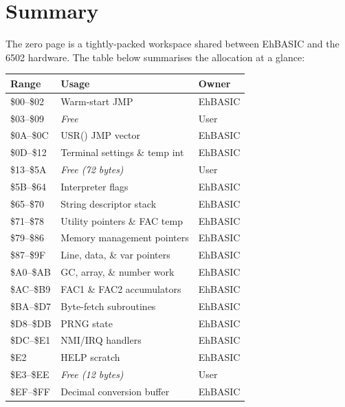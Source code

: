 \section*{Summary}

The zero page is a tightly-packed workspace shared between EhBASIC and the
6502 hardware.  The table below summarises the allocation at a glance:

\begin{center}
\small
\begin{tabular}{@{}lll@{}}
\toprule
\textbf{Range} & \textbf{Usage} & \textbf{Owner} \\
\midrule
\$00--\$02     & Warm-start JMP               & EhBASIC \\
\$03--\$09     & \textit{Free}                & User \\
\$0A--\$0C     & USR() JMP vector             & EhBASIC \\
\$0D--\$12     & Terminal settings \& temp int & EhBASIC \\
\$13--\$5A     & \textit{Free (72 bytes)}     & User \\
\$5B--\$64     & Interpreter flags            & EhBASIC \\
\$65--\$70     & String descriptor stack       & EhBASIC \\
\$71--\$78     & Utility pointers \& FAC temp  & EhBASIC \\
\$79--\$86     & Memory management pointers   & EhBASIC \\
\$87--\$9F     & Line, data, \& var pointers  & EhBASIC \\
\$A0--\$AB     & GC, array, \& number work    & EhBASIC \\
\$AC--\$B9     & FAC1 \& FAC2 accumulators    & EhBASIC \\
\$BA--\$D7     & Byte-fetch subroutines       & EhBASIC \\
\$D8--\$DB     & PRNG state                   & EhBASIC \\
\$DC--\$E1     & NMI/IRQ handlers             & EhBASIC \\
\$E2           & HELP scratch                 & EhBASIC \\
\$E3--\$EE     & \textit{Free (12 bytes)}     & User \\
\$EF--\$FF     & Decimal conversion buffer    & EhBASIC \\
\bottomrule
\end{tabular}
\end{center}
